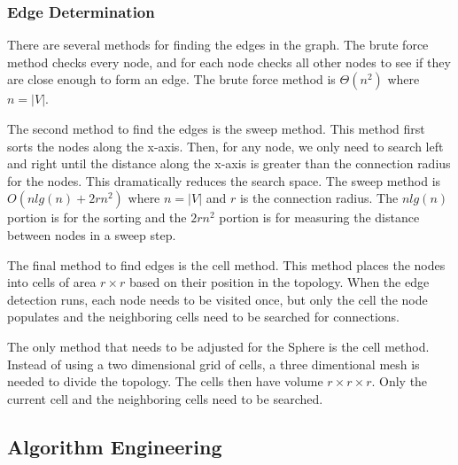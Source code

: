 \documentclass{article}
\begin{document}
        \subsubsection{Edge Determination}
        There are several methods for finding the edges in the graph. The brute force method checks every node, and for each node checks all other nodes to see if they are close enough to form an edge. The brute force method is $\Theta\left(n^2\right)$ where $n = |V|$.
        \par
        The second method to find the edges is the sweep method. This method first sorts the nodes along the x-axis. Then, for any node, we only need to search left and right until the distance along the x-axis is greater than the connection radius for the nodes. This dramatically reduces the search space. The sweep method is $O\left(n lg(n) + 2rn^2\right)$ where $n = |V|$ and $r$ is the connection radius. The $n lg(n)$ portion is for the sorting and the $2rn^2$ portion is for measuring the distance between nodes in a sweep step.
        \par
        The final method to find edges is the cell method. This method places the nodes into cells of area $r \times r$ based on their position in the topology. When the edge detection runs, each node needs to be visited once, but only the cell the node populates and the neighboring cells need to be searched for connections.
        \par
        The only method that needs to be adjusted for the Sphere is the cell method. Instead of using a two dimensional grid of cells, a three dimentional mesh is needed to divide the topology. The cells then have volume $r \times r \times r$. Only the current cell and the neighboring cells need to be searched.

    \subsection{Algorithm Engineering}
\end{document}
